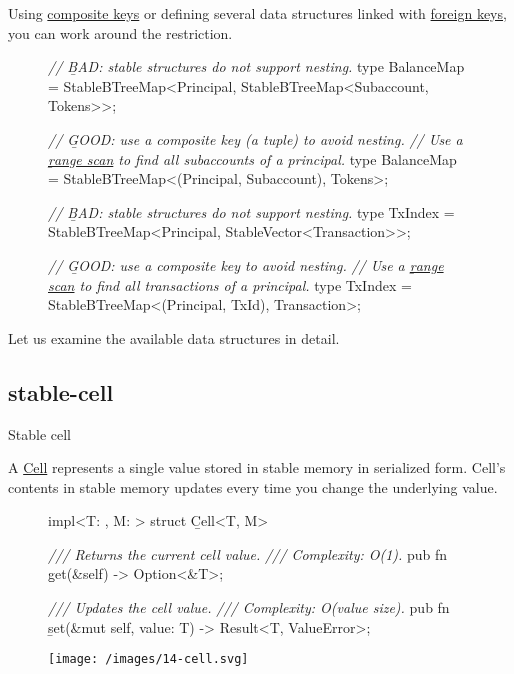 \documentclass{article}
\begin{document}
Using \href{https://en.wikipedia.org/wiki/Composite_key}{composite keys} or defining several data structures linked with \href{https://en.wikipedia.org/wiki/Foreign_key}{foreign keys}, you can work around the restriction.

\begin{figure}
\begin{code}[bad]
\emph{// \b{BAD}: stable structures do not support nesting.}
type BalanceMap = StableBTreeMap<Principal, StableBTreeMap<Subaccount, Tokens>>;
\end{code}
\begin{code}[good]
\emph{// \b{GOOD}: use a composite key (a tuple) to avoid nesting.}
\emph{// Use a \href{#range-scan-example}{\b{range scan}} to find all subaccounts of a principal.}
type BalanceMap = StableBTreeMap<(Principal, Subaccount), Tokens>;
\end{code}
\begin{code}[bad]
\emph{// \b{BAD}: stable structures do not support nesting.}
type TxIndex = StableBTreeMap<Principal, StableVector<Transaction>>;
\end{code}
\begin{code}[good]
\emph{// \b{GOOD}: use a composite key to avoid nesting.}
\emph{// Use a \href{#range-scan-example}{\b{range scan}} to find all transactions of a principal.}
type TxIndex = StableBTreeMap<(Principal, TxId), Transaction>;
\end{code}
\end{figure}

Let us examine the available data structures in detail.

\subsection{stable-cell}{Stable cell}

A \href{https://docs.rs/ic-stable-structures/latest/ic_stable_structures/cell/struct.Cell.html}{Cell} represents a single value stored in stable memory in serialized form.
Cell's contents in stable memory updates every time you change the underlying value.

\begin{figure}
\begin{code}[rust]
impl<T: \href{#storable-trait}{}, M: \href{#memory}{}> struct \b{Cell}<T, M> {
    \emph{/// Returns the current cell value.}
    \emph{/// Complexity: O(1).}
    pub fn \b{get}(&self) -> Option<&T>;

    \emph{/// Updates the cell value.}
    \emph{/// Complexity: O(value size).}
    pub fn \b{set}(&mut self, value: T) -> Result<T, ValueError>;
}
\end{code}
\end{figure}
\begin{figure}[grayscale-diagram]
  \texttt{[image: /images/14-cell.svg]}
\end{figure}
\end{document}
